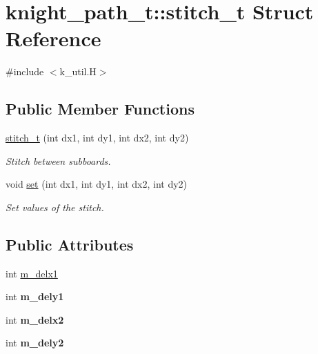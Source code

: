 \hypertarget{structknight__path__t_1_1stitch__t}{\section{knight\-\_\-path\-\_\-t\-:\-:stitch\-\_\-t \-Struct \-Reference}
\label{structknight__path__t_1_1stitch__t}
}


{\ttfamily \#include $<$k\-\_\-util.\-H$>$}

\subsection*{\-Public \-Member \-Functions}
\begin{DoxyCompactItemize}
\item 
\hypertarget{structknight__path__t_1_1stitch__t_a450b952e88ecfb61e2ba87dcd0384de5}{\hyperlink{structknight__path__t_1_1stitch__t_a450b952e88ecfb61e2ba87dcd0384de5}{stitch\-\_\-t} (int dx1, int dy1, int dx2, int dy2)}\label{structknight__path__t_1_1stitch__t_a450b952e88ecfb61e2ba87dcd0384de5}

\begin{DoxyCompactList}\small\item\em \-Stitch between subboards. \end{DoxyCompactList}\item 
\hypertarget{structknight__path__t_1_1stitch__t_a5d2e741df188a6f80433390c5ee74eb9}{void \hyperlink{structknight__path__t_1_1stitch__t_a5d2e741df188a6f80433390c5ee74eb9}{set} (int dx1, int dy1, int dx2, int dy2)}\label{structknight__path__t_1_1stitch__t_a5d2e741df188a6f80433390c5ee74eb9}

\begin{DoxyCompactList}\small\item\em \-Set values of the stitch. \end{DoxyCompactList}\end{DoxyCompactItemize}
\subsection*{\-Public \-Attributes}
\begin{DoxyCompactItemize}
\item 
int \hyperlink{structknight__path__t_1_1stitch__t_a1068379b0687791fa8573f79c4c67788}{m\-\_\-delx1}
\item 
\hypertarget{structknight__path__t_1_1stitch__t_aad154c461889bbe3509d27e4175ae7fe}{int {\bfseries m\-\_\-dely1}}\label{structknight__path__t_1_1stitch__t_aad154c461889bbe3509d27e4175ae7fe}

\item 
\hypertarget{structknight__path__t_1_1stitch__t_aca00e475edfd5ffa31e7a013fd1345b1}{int {\bfseries m\-\_\-delx2}}\label{structknight__path__t_1_1stitch__t_aca00e475edfd5ffa31e7a013fd1345b1}

\item 
\hypertarget{structknight__path__t_1_1stitch__t_a27bc31a7949ebc918b307cb032aec710}{int {\bfseries m\-\_\-dely2}}\label{structknight__path__t_1_1stitch__t_a27bc31a7949ebc918b307cb032aec710}

\end{DoxyCompactItemize}


